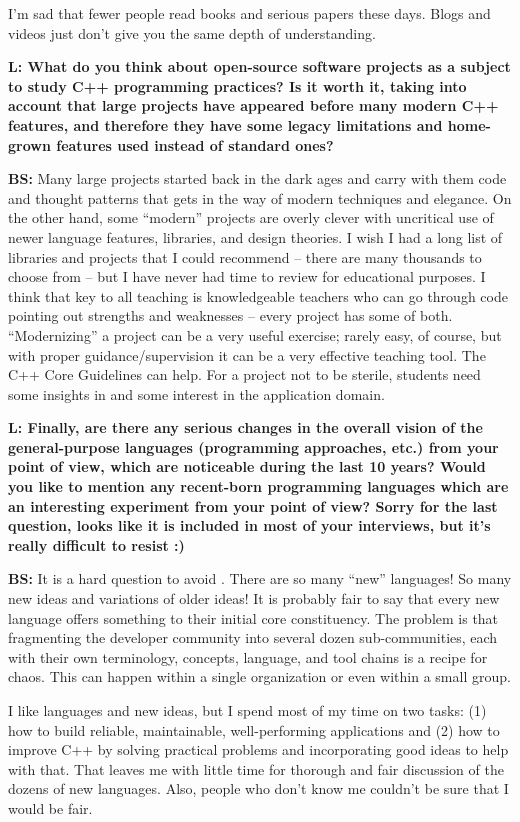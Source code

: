 \documentclass[10pt, a5paper]{article}
\begin{document}
\begin{Parallel}[p]{}{}
{I’m sad that fewer people read books and serious papers these days. Blogs and videos just don’t give you the same depth of understanding.

{\noindent \bf L: What do you think about open-source software projects as a subject to study C++ programming practices? Is it worth it, taking into account that large projects have appeared before many modern C++ features, and therefore they have some legacy limitations and home-grown features used instead of standard ones? }

{\noindent \bf BS:}  Many large projects started back in the dark ages and carry with them code and thought patterns that gets in the way of modern techniques and elegance. On the other hand, some “modern” projects are overly clever with uncritical use of newer language features, libraries, and design theories. I wish I had a long list of libraries and projects that I could recommend – there are many thousands to choose from – but I have never had time to review for educational purposes. I think that key to all teaching is knowledgeable teachers who can go through code pointing out strengths and weaknesses – every project has some of both. “Modernizing” a project can be a very useful exercise; rarely easy, of course, but with proper guidance/supervision it can be a very effective teaching tool. The C++ Core Guidelines can help. For a project not to be sterile, students need some insights in and some interest in the application domain.

{\noindent \bf L: Finally, are there any serious changes in the overall vision of the general-purpose languages (programming approaches, etc.) from your point of view, which are noticeable during the last 10 years? Would you like to mention any recent-born programming languages which are an interesting experiment from your point of view? Sorry for the last question, looks like it is included in most of your interviews, but it’s really difficult to resist :) }

{\noindent \bf BS:} It is a hard question to avoid \Smiley{}. There are so many ``new'' languages! So many new ideas and variations of older ideas! It is probably fair to say that every new language offers something to their initial core constituency. The problem is that fragmenting the developer community into several dozen sub-communities, each with their own terminology, concepts, language, and tool chains is a recipe for chaos. This can happen within a single organization or even within a small group.

I like languages and new ideas, but I spend most of my time on two tasks: (1) how to build reliable, maintainable, well-performing applications and (2) how to improve C++ by solving practical problems and incorporating good ideas to help with that. That leaves me with little time for thorough and fair discussion of the dozens of new languages. Also, people who don’t know me couldn’t be sure that I would be fair.

}
\end{Parallel}
\end{document}
